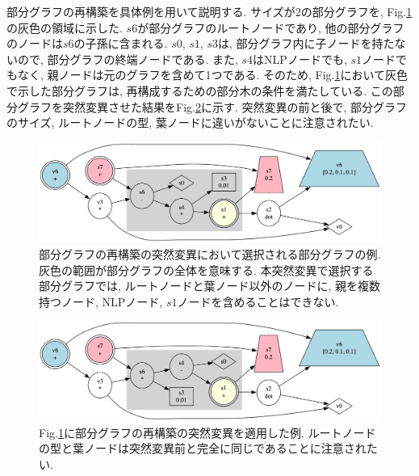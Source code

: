 \documentclass[11pt,oneside,openany,report]{jsbook}
\begin{document}
部分グラフの再構築を具体例を用いて説明する. サイズが2の部分グラフを, Fig.\ref{fig:mgg_automl_zero_vag:mutation:subgraph}の灰色の領域に示した. $s6$が部分グラフのルートノードであり, 他の部分グラフのノードは$s6$の子孫に含まれる. $s0$, $s1$, $s3$は, 部分グラフ内に子ノードを持たないので, 部分グラフの終端ノードである. また, $s4$はNLPノードでも, $s1$ノードでもなく, 親ノードは元のグラフを含めて1つである. そのため, Fig.\ref{fig:mgg_automl_zero_vag:mutation:subgraph}において灰色で示した部分グラフは, 再構成するための部分木の条件を満たしている. この部分グラフを突然変異させた結果をFig.\ref{fig:mgg_automl_zero_vag:mutation:mutated_subgraph}に示す. 突然変異の前と後で, 部分グラフのサイズ, ルートノードの型, 葉ノードに違いがないことに注意されたい.

\begin{figure}
  \centering
  \includegraphics[width=14cm]{mgg_automl_zero_vag/mutations/subgraph.png}
  \caption{部分グラフの再構築の突然変異において選択される部分グラフの例. 灰色の範囲が部分グラフの全体を意味する. 本突然変異で選択する部分グラフでは, ルートノードと葉ノード以外のノードに, 親を複数持つノード, NLPノード, $s1$ノードを含めることはできない.}
  \label{fig:mgg_automl_zero_vag:mutation:subgraph}
\end{figure}

\begin{figure}
  \centering
  \includegraphics[width=14cm]{mgg_automl_zero_vag/mutations/mutated_subgraph.png}
  \caption{Fig.\ref{fig:mgg_automl_zero_vag:mutation:subgraph}に部分グラフの再構築の突然変異を適用した例. ルートノードの型と葉ノードは突然変異前と完全に同じであることに注意されたい.}
  \label{fig:mgg_automl_zero_vag:mutation:mutated_subgraph}
\end{figure}
\end{document}
